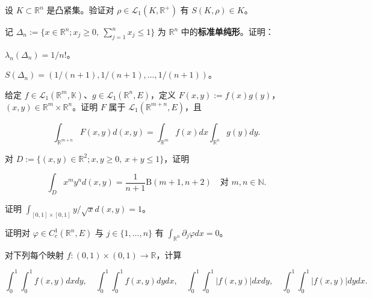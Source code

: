 \begin{exercises}
\item

设 $ K \subset \mathbb{R}^n $ 是凸紧集。验证对 $ \rho \in \mathcal{L}_1(K, \mathbb{R}^+) $ 有 $ S(K,\rho) \in K $。

\item

记 $ \Delta_n := \{ x \in \mathbb{R}^n ; x_j \ge 0,\ \sum_{j=1}^n x_j \le 1 \} $ 为 $ \mathbb{R}^n $ 中的\textbf{标准单纯形}。证明：

\begin{items}
\item

$ \lambda_n(\Delta_n) = 1/n! $。

\item

$ S(\Delta_n) = (1/(n+1), 1/(n+1), \ldots, 1/(n+1)) $。

\end{items}

\item

给定 $ f \in \mathcal{L}_1(\mathbb{R}^m, \mathbb{K}) $、$ g \in \mathcal{L}_1(\mathbb{R}^n, E) $，定义 $ F(x,y) := f(x)g(y) $，$ (x,y) \in \mathbb{R}^m\times\mathbb{R}^n $。证明 $ F $ 属于 $ \mathcal{L}_1(\mathbb{R}^{m+n}, E) $，且

\[
\int_{\mathbb{R}^{m+n}} F(x,y) d(x,y) = \int_{\mathbb{R}^m} f(x) dx \int_{\mathbb{R}^n} g(y) dy .
\]
\item

对 $ D := \{ (x,y) \in \mathbb{R}^2 ; x,y \ge 0,\ x+y \le 1 \} $，证明

\[
\int_D x^m y^n d(x,y) = \frac{1}{n+1} \mathrm{B}(m+1, n+2) \quad \text{对 } m,n \in \mathbb{N} .
\]
\item

证明 $ \int_{[0,1]\times[0,1]} y/\sqrt{x} d(x,y) = 1 $。

\item

证明对 $ \varphi \in C_c^1(\mathbb{R}^n, E) $ 与 $ j \in \{1,\ldots,n\} $ 有 $ \int_{\mathbb{R}^n} \partial_j\varphi dx = 0 $。

\item

对下列每个映射 $ f: (0,1)\times(0,1) \to \mathbb{R} $，计算

\[
\int_0^1\int_0^1 f(x,y) dx dy , \quad \int_0^1\int_0^1 f(x,y) dy dx , \quad \int_0^1\int_0^1 |f(x,y)| dx dy , \quad \int_0^1\int_0^1 |f(x,y)| dy dx .
\]

\begin{items}
\item


\end{items}
\end{exercises}

